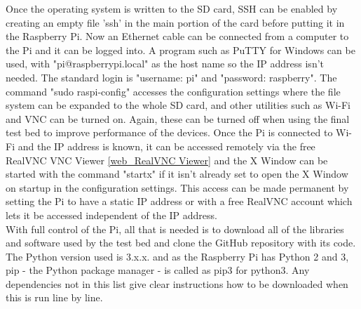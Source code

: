 \documentclass[../main.tex]{subfiles}
\begin{document}
Once the operating system is written to the SD card, SSH can be enabled by creating an empty file 'ssh' in the main portion of the card before putting it in the Raspberry Pi.
Now an Ethernet cable can be connected from a computer to the Pi and it can be logged into.
A program such as PuTTY for Windows can be used, with "pi@raspberrypi.local" as the host name so the IP address isn't needed.
The standard login is "username: pi" and "password: raspberry".
The command "sudo raspi-config" accesses the configuration settings where the file system can be expanded to the whole SD card, and other utilities such as Wi-Fi and VNC can be turned on.
Again, these can be turned off when using the final test bed to improve performance of the devices.
Once the Pi is connected to Wi-Fi and the IP address is known, it can be accessed remotely via the free RealVNC VNC Viewer \ref{web_RealVNC Viewer} and the X Window can be started with the command "startx" if it isn't already set to open the X Window on startup in the configuration settings.
This access can be made permanent by setting the Pi to have a static IP address or with a free RealVNC account which lets it be accessed independent of the IP address.\\

With full control of the Pi, all that is needed is to download all of the libraries and software used by the test bed and clone the GitHub repository with its code.
The Python version used is 3.x.x.
and as the Raspberry Pi has Python 2 and 3, pip - the Python package manager - is called as pip3 for python3.
Any dependencies not in this list give clear instructions how to be downloaded when this is run line by line.\\
\end{document}
